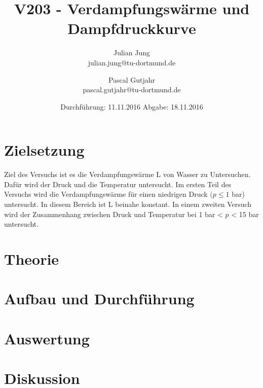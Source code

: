 

\title{V203 - Verdampfungswärme und Dampfdruckkurve}
\author{Julian Jung \\ julian.jung@tu-dortmund.de
  \and Pascal Gutjahr \\ pascal.gutjahr@tu-dortmund.de}
  \date{Durchführung: 11.11.2016
  \hspace{3em}
  Abgabe: 18.11.2016}
  
\maketitle
\newpage
\tableofcontents
\newpage
\section{Zielsetzung}
Ziel des Versuchs ist es die Verdampfungswärme L von Wasser zu Untersuchen.
Dafür wird der Druck und die Temperatur untersucht. Im ersten Teil des Versuchs
wird die Verdampfungswärme für einen niedrigen Druck $(p\le 1$ bar) untersucht. In
diesem Bereich ist L beinahe konstant. In einem zweiten Versuch wird der Zusammenhang
zwischen Druck und Temperatur bei 1 bar < $p$ < 15 bar untersucht.
\section{Theorie}

\section{Aufbau und Durchführung}

\section{Auswertung}

\section{Diskussion}

\printbibliography

